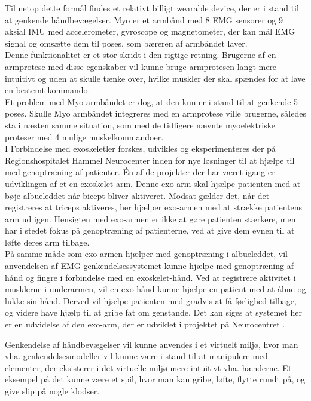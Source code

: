 Til netop dette formål findes et relativt billigt wearable device, der er i stand til at genkende håndbevægelser. Myo er et armbånd med 8 EMG sensorer og 9 aksial IMU med accelerometer, gyroscope og magnetometer, der kan mål EMG signal og omsætte dem til poses, som bæreren af armbåndet laver. \\
Denne funktionalitet er et stor skridt i den rigtige retning. Brugerne af en armprotese med disse egenskaber vil kunne bruge armprotesen langt mere intuitivt og uden at skulle tænke over, hvilke muskler der skal spændes for at lave en bestemt kommando.\\
Et problem med Myo armbåndet er dog, at den kun er i stand til at genkende 5 poses. Skulle Myo armbåndet integreres med en armprotese ville brugerne, således stå i næsten samme situation, som med de tidligere nævnte myoelektriske proteser med 4 mulige muskelkommandoer.\\

I Forbindelse med exoskeletler forskes, udvikles og eksperimenteres der på Regionshospitalet Hammel Neurocenter inden for nye løsninger til at hjælpe til med genoptræning af patienter. Én af de projekter der har været igang er udviklingen af et en exoskelet-arm. Denne exo-arm skal hjælpe patienten med at bøje albueleddet når bicept bliver aktiveret. Modsat gælder det, når det registreres at triceps aktiveres, her hjælper exo-armen med at strække patientens arm ud igen. Hensigten med exo-armen er ikke at gøre patienten stærkere, men har i stedet fokus på genoptræning af patienterne, ved at give dem evnen til at løfte deres arm tilbage.\\

På samme måde som exo-armen hjælper med genoptræning i albueleddet, vil anvendelsen af EMG genkendelsessystemet kunne hjælpe med genoptræning af hånd og fingre i forbindelse med en exoskelet-hånd. Ved at registrere aktivitet i musklerne i underarmen, vil en exo-hånd kunne hjælpe en patient med at åbne og lukke sin hånd. Derved vil hjælpe patienten med gradvis at få førlighed tilbage, og videre have hjælp til at gribe fat om genstande. Det kan siges at systemet her er en udvidelse af den exo-arm, der er udviklet i projektet på Neurocentret \citep{RefWorks:7}.

Genkendelse af håndbevægelser vil kunne anvendes i et virtuelt miljø, hvor man vha.  genkendelsesmodeller vil kunne være i stand til at manipulere med elementer, der eksisterer i det virtuelle miljø mere intuitivt vha. hænderne. Et eksempel på det kunne være et spil, hvor man kan gribe, løfte, flytte rundt på, og give slip på nogle klodser.
